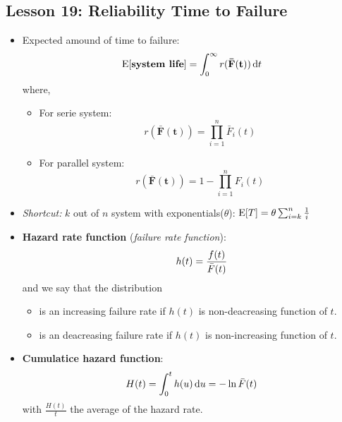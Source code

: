 \documentclass[10pt, french]{article}
\begin{document}
\begin{multicols*}{3}
\section*{Lesson 19: Reliability Time to Failure}
\begin{itemize}[align=left,leftmargin=*]
    \item Expected amound of time to failure: \[ \mathrm{E} {\left[ \textbf{system life} \right]} = \int_0^\infty r(\mathbf{\bar{F}(t)}) \mathop{}\!\mathrm{d}{t} \]
    where,
    \begin{itemize}
        \item For serie system: \[ r(\mathbf{\bar{F}(t)}) = \prod_{i=1}^n \bar{F}_i(t) \]
        \item For parallel system: \[ r(\mathbf{\bar{F}(t)}) = 1 - \prod_{i=1}^n F_i(t) \]
    \end{itemize}
    \item \emph{Shortcut:} $k$ out of $n$ system with exponentials($\theta$): $\mathrm{E} {\left[ T \right]}=\theta \sum_{i=k}^n \frac{1}{i}$
    \item \textbf{Hazard rate function} (\emph{failure rate function}): \[ \hspace{.7cm} h(t) = \frac{f(t)}{\bar{F}(t)} \]
    and we say that the distribution
    \begin{itemize}
        \item is an increasing failure rate if $h(t)$ is non-deacreasing function of $t$.
        \item is an deacreasing failure rate if $h(t)$ is non-increasing function of $t$.
    \end{itemize}
    \item \textbf{Cumulatice hazard function}: \[ H(t) = \int_0^t h(u) \mathop{}\!\mathrm{d}{u}= -\ln \bar{F}(t)  \] with $\frac{H(t)}{t}$ the average of the hazard rate.
\end{itemize}

\def\SectionColor{purple!80!white}

\end{multicols*}
\end{document}
